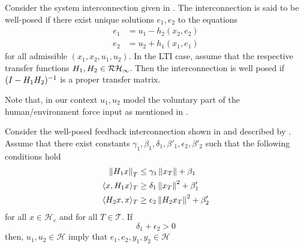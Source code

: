 \begin{define} Consider the system interconnection given in . The interconnection is said to 
be well-posed if there exist unique solutions $e_1,e_2$ to the equations
\begin{align}\label{eq:apdx:passint1}
e_1 &= u_1-h_2(x_2,e_2)\\\label{eq:apdx:passint2}
e_2 &= u_2+h_1(x_1,e_1)
\end{align}
for all admissible $(x_1,x_2,u_1,u_2)$. In the LTI case, assume that the respective transfer functions $H_1,H_2\in\mathcal{RH}_\infty$. Then
the interconnection is well posed if $(I-H_1H_2)^{-1}$ is a proper transfer matrix.
\end{define}

Note that, in our context $u_1,u_2$ model the voluntary part of the human/en\-vi\-ron\-ment force input as mentioned in . 



\begin{thm}Consider the well-posed feedback interconnection shown in  and 
described by . Assume that there exist constants $\gamma_1,\beta_1,
\delta_1,\beta'_1,\epsilon_2,\beta'_2$ such that the following conditions hold
\begin{align}
\displaystyle \left\| H_1x \right\|_T &\leq \gamma_1\displaystyle \left\| x_T \right\|+\beta_1\\
\langle x,H_1x\rangle_T &\geq \delta_1\displaystyle \left\| x_T \right\|^2+\beta'_1\\
\langle H_2x,x\rangle_T &\geq \epsilon_2\displaystyle \left\| H_2x_T \right\|^2+\beta'_2
\end{align}
for all $x\in\mathcal{H}_e$ and for all $T\in\mathcal{T}$. If 
\begin{equation}
\delta_1+\epsilon_2 >0
\label{eq:apdx:actpas}
\end{equation}
then, $u_1,u_2 \in \mathcal{H}$ imply that $e_1,e_2,y_1,y_2\in\mathcal{H}$ 
\end{thm}

